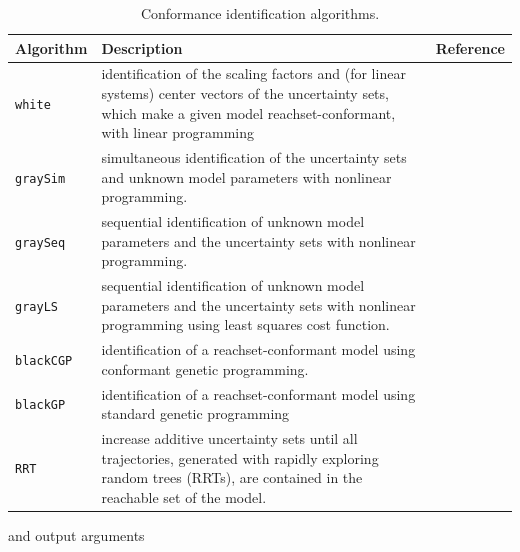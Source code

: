 \begin{table}[h]
	\caption{Conformance identification algorithms.}
	\centering
	\label{tab:confAlg}
	\begin{tabular}{l p{9cm} l}
		\toprule
		\textbf{Algorithm} & \textbf{Description} & \textbf{Reference} \\
		\midrule
		\texttt{white} & identification of the scaling factors and (for linear systems) center vectors of the uncertainty sets, which make a given model reachset-conformant, with linear programming & \cite{Luetzow2024a} \\
		\texttt{graySim} & simultaneous identification of the uncertainty sets and unknown model parameters with nonlinear programming. & \cite{Luetzow2024b} \\
		\texttt{graySeq} & sequential identification of unknown model parameters and the uncertainty sets with nonlinear programming. & \cite{Luetzow2024b} \\
		\texttt{grayLS} & sequential identification of unknown model parameters and the uncertainty sets with nonlinear programming using least squares cost function. &  \cite{Luetzow2024b} \\
		\texttt{blackCGP} & identification of a reachset-conformant model using conformant genetic programming. &  \cite{Luetzow2024b} \\
		\texttt{blackGP} & identification of a reachset-conformant model using standard genetic programming & \cite{Luetzow2024b} \\
		\texttt{RRT} & increase additive uncertainty sets until all trajectories, generated with rapidly exploring random trees (RRTs), are contained in the reachable set of the model. & \cite{Althoff2012b} \\
		\bottomrule
	\end{tabular}
\end{table}

and output arguments

